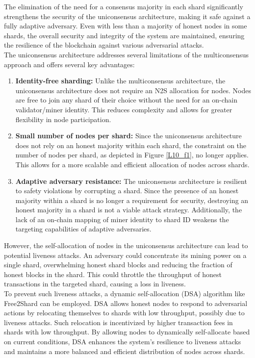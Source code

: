 The elimination of the need for a consensus majority in each shard significantly strengthens the security of the uniconsensus architecture, making it safe against a fully adaptive adversary. Even with less than a majority of honest nodes in some shards, the overall security and integrity of the system are maintained, ensuring the resilience of the blockchain against various adversarial attacks.\\
The uniconsensus architecture addresses several limitations of the multiconsensus approach and offers several key advantages:
\begin{enumerate}
	\item \textbf{Identity-free sharding:} Unlike the multiconsensus architecture, the uniconsensus architecture does not require an N2S allocation for nodes. Nodes are free to join any shard of their choice without the need for an on-chain validator/miner identity. This reduces complexity and allows for greater flexibility in node participation.
	\item \textbf{Small number of nodes per shard:} Since the uniconsensus architecture does not rely on an honest majority within each shard, the constraint on the number of nodes per shard, as depicted in Figure \ref{L10_f1}, no longer applies. This allows for a more scalable and efficient allocation of nodes across shards.
	\item \textbf{Adaptive adversary resistance:} The uniconsensus architecture is resilient to safety violations by corrupting a shard. Since the presence of an honest majority within a shard is no longer a requirement for security, destroying an honest majority in a shard is not a viable attack strategy. Additionally, the lack of an on-chain mapping of miner identity to shard ID weakens the targeting capabilities of adaptive adversaries.
\end{enumerate}
However, the self-allocation of nodes in the uniconsensus architecture can lead to potential liveness attacks. An adversary could concentrate its mining power on a single shard, overwhelming honest shard blocks and reducing the fraction of honest blocks in the shard. This could throttle the throughput of honest transactions in the targeted shard, causing a loss in liveness.\\
To prevent such liveness attacks, a dynamic self-allocation (DSA) algorithm like Free2Shard can be employed. DSA allows honest nodes to respond to adversarial actions by relocating themselves to shards with low throughput, possibly due to liveness attacks. Such relocation is incentivized by higher transaction fees in shards with low throughput. By allowing nodes to dynamically self-allocate based on current conditions, DSA enhances the system's resilience to liveness attacks and maintains a more balanced and efficient distribution of nodes across shards.
